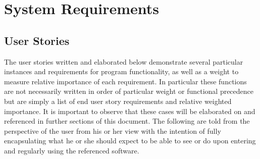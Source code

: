 \chapter{System Requirements}

\section{User Stories}

The user stories written and elaborated below demonstrate several particular instances and
requirements for program functionality, as well as a weight to measure relative importance of
each requirement. In particular these functions are not necessarily written in order of
particular weight or functional precedence but are simply a list of end user story requirements
and relative weighted importance. It is important to observe that these cases will be
elaborated on and referenced in further sections of this document. The following are told
from the perspective of the user from his or her view with the intention of fully encapsulating
what he or she should expect to be able to see or do upon entering and regularly using the
referenced software. \\

